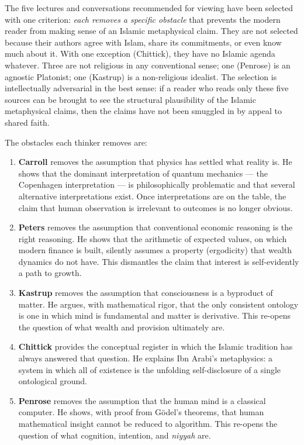 \documentclass[11pt,a4paper]{book}
\theoremstyle{cleanrm}
\begin{document}
The five lectures and conversations recommended for viewing have been
selected with one criterion: \emph{each removes a specific obstacle}
that prevents the modern reader from making sense of an Islamic
metaphysical claim. They are not selected because their authors agree
with Islam, share its commitments, or even know much about it. With
one exception (Chittick), they have no Islamic agenda whatever. Three
are not religious in any conventional sense; one (Penrose) is an
agnostic Platonist; one (Kastrup) is a non-religious idealist. The
selection is intellectually adversarial in the best sense: if a reader
who reads only these five sources can be brought to see the structural
plausibility of the Islamic metaphysical claims, then the claims have
not been smuggled in by appeal to shared faith.

The obstacles each thinker removes are:

\begin{enumerate}[leftmargin=2em]
    \item \textbf{Carroll} removes the assumption that physics has
    settled what reality is. He shows that the dominant interpretation
    of quantum mechanics --- the Copenhagen interpretation --- is
    philosophically problematic and that several alternative
    interpretations exist. Once interpretations are on the table,
    the claim that human observation is irrelevant to outcomes is no
    longer obvious.
    \item \textbf{Peters} removes the assumption that conventional
    economic reasoning is the right reasoning. He shows that the
    arithmetic of expected values, on which modern finance is built,
    silently assumes a property (ergodicity) that wealth dynamics
    do not have. This dismantles the claim that interest is
    self-evidently a path to growth.
    \item \textbf{Kastrup} removes the assumption that consciousness is
    a byproduct of matter. He argues, with mathematical
    rigor, that the only consistent ontology is one in which mind is
    fundamental and matter is derivative. This re-opens the question of
    what wealth and provision ultimately are.
    \item \textbf{Chittick} provides the conceptual register in which
    the Islamic tradition has always answered that question.
    He explains Ibn Arabi's metaphysics: a system in which all of
    existence is the unfolding self-disclosure of a single ontological
    ground.
    \item \textbf{Penrose} removes the assumption that the human mind
    is a classical computer. He shows, with proof from G\"odel's
    theorems, that human mathematical insight cannot be reduced to
    algorithm. This re-opens the question of what cognition,
    intention, and \emph{niyyah} are.
\end{enumerate}
\end{document}
